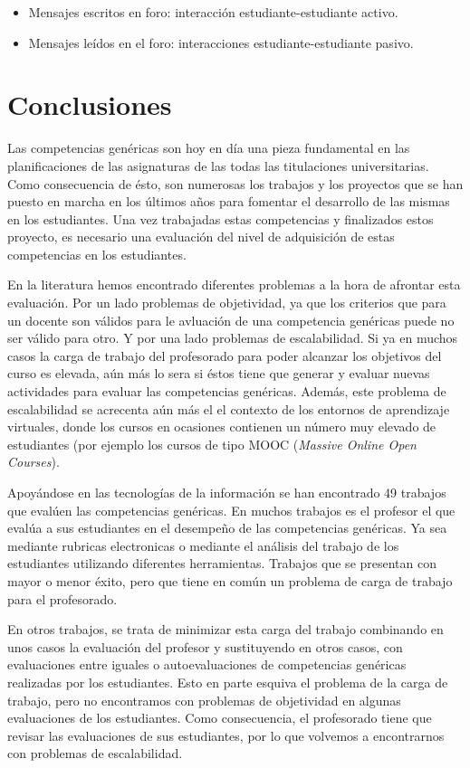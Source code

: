 \begin{itemize}
\item Mensajes escritos en foro: interacción estudiante-estudiante activo.
\item Mensajes leídos en el foro:  interacciones estudiante-estudiante pasivo.
\end{itemize}

\section{Conclusiones}

Las competencias genéricas son hoy en día una pieza fundamental en las planificaciones de las asignaturas de las todas las titulaciones universitarias. Como consecuencia de ésto, son numerosas los trabajos y los proyectos que se han puesto en marcha en los últimos años para fomentar el desarrollo de las mismas en los estudiantes. Una vez trabajadas estas competencias y finalizados estos proyecto, es necesario una evaluación del nivel de adquisición de estas competencias en los estudiantes.

En la literatura hemos encontrado diferentes problemas a la hora de afrontar esta evaluación. Por un lado problemas de objetividad, ya que los criterios que para un docente son válidos para le avluación de una competencia genéricas puede no ser válido para otro. Y por una lado problemas de escalabilidad. Si ya en muchos casos la carga de trabajo del profesorado para poder alcanzar los objetivos del curso es elevada, aún más lo sera si éstos tiene que generar y evaluar nuevas actividades para evaluar las competencias genéricas. Además, este problema de escalabilidad se acrecenta aún más el el contexto de los entornos de aprendizaje virtuales, donde los cursos en ocasiones contienen un número muy elevado de estudiantes (por ejemplo los cursos de tipo MOOC (\emph{Massive Online Open Courses}).

Apoyándose en las tecnologías de la información se han encontrado 49 trabajos que evalúen las competencias genéricas. En muchos trabajos es el profesor el que evalúa a sus estudiantes en el desempeño de las competencias genéricas. Ya sea mediante rubricas electronicas o mediante el análisis del trabajo de los estudiantes utilizando diferentes herramientas. Trabajos que se presentan con mayor o menor éxito, pero que tiene en común un problema de carga de trabajo para el profesorado.

En otros trabajos, se trata de minimizar esta carga del trabajo combinando en unos casos la evaluación del profesor y sustituyendo en otros casos, con evaluaciones entre iguales o autoevaluaciones de competencias genéricas realizadas por los estudiantes. Esto en parte esquiva el problema de la carga de trabajo, pero no encontramos con problemas de objetividad en algunas evaluaciones de los estudiantes. Como consecuencia, el profesorado tiene que revisar las evaluaciones de sus estudiantes, por lo que volvemos a encontrarnos con problemas de escalabilidad.

